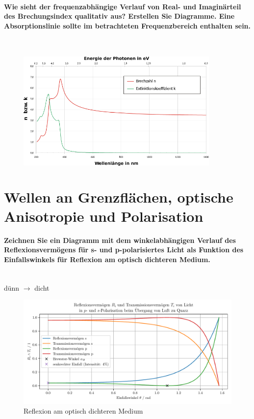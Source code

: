 \documentclass[a4paper, 11pt, ngerman, parskip=half-]{scrartcl}
\begin{document}
\paragraph{Wie sieht der frequenzabhängige Verlauf von Real- und Imaginärteil des Brechungsindex
    qualitativ aus? Erstellen Sie Diagramme. Eine Absorptionslinie sollte im betrachteten
    Frequenzbereich enthalten sein.} ~

\begin{figure}[H]
    \centering
    \includegraphics[width=10cm]{image/14/6}
\end{figure}

\newpage

\section{Wellen an Grenzflächen, optische Anisotropie und Polarisation}
\label{Wellen an Grenzflaechen, optische Anisotropie und Polarisation}
%
\paragraph{Zeichnen Sie ein Diagramm mit dem winkelabhängigen Verlauf des Reflexionsvermögens für s- und p-polarisiertes Licht
    als Funktion des Einfallswinkels für Reflexion am optisch dichteren Medium.}~\\
%
dünn $\rightarrow$ dicht
%
\begin{figure}[H]
    \centering
    \begin{samepage}
        \includegraphics[width=\textwidth]{image/15/Luft_zu_Quarz.pdf}
        \caption{Reflexion am optisch dichteren Medium}
        \label{fig:reflexion_dicht}
    \end{samepage}
\end{figure}
%
\end{document}
